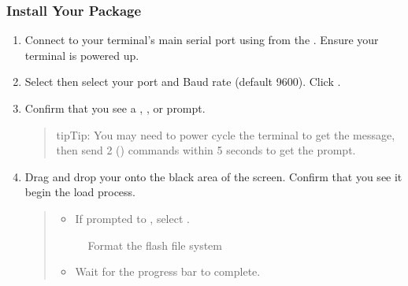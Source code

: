\documentclass[letterpaper,10pt,english]{sphinxmanual}
\begin{document}
\subsubsection{Install Your Package}
\label{\detokenize{usage:install-your-package}}\begin{enumerate}
\item {} 
Connect to your terminal’s main serial port using  from the .  Ensure your terminal is powered up.

\item {} 
Select  then select your  port and Baud rate (default 9600).  Click .

\item {} 
Confirm that you see a , \sphinxcode{\sphinxupquote{\#}}, or  prompt.
\begin{quote}

\begin{sphinxadmonition}{tip}{Tip:}
You may need to power cycle the terminal to get the  message, then send 2  () commands within 5 seconds to get the  prompt.
\end{sphinxadmonition}
\end{quote}

\item {} 
Drag and drop your  onto the black area of the screen.  Confirm that you see it begin the load process.
\begin{quote}
\begin{itemize}
\item {} 
If prompted to , select .

\end{itemize}

\begin{figure}[htbp]
\centering
\capstart

\noindent{}
\caption{Format the flash file system}\label{\detokenize{usage:id3}}\end{figure}
\begin{itemize}
\item {} 
Wait for the progress bar to complete.


\end{itemize}
\end{quote}
\end{enumerate}
\end{document}
